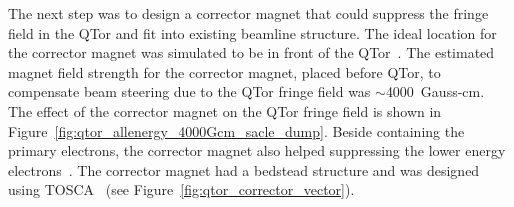 
The next step was to design a corrector magnet that could suppress the fringe field in the QTor and fit into existing beamline structure. The ideal location for the corrector magnet was simulated to be in front of the QTor~\cite{elog:nur_qtor5}.
The estimated magnet field strength for the corrector magnet, placed before QTor, to compensate beam steering due to the QTor fringe field was $\sim$4000~Gauss-cm. The effect of the corrector magnet on the QTor fringe field is shown in Figure~\ref{fig:qtor_allenergy_4000Gcm_sacle_dump}.
Beside containing the primary electrons, the corrector magnet also helped suppressing the lower energy electrons~\cite{elog:nur_qtor6}. The corrector magnet had a bedstead structure and was designed using TOSCA~\cite{elog:nur_qtor7, elog:nur_qtor8} (see Figure~\ref{fig:qtor_corrector_vector}).

%

